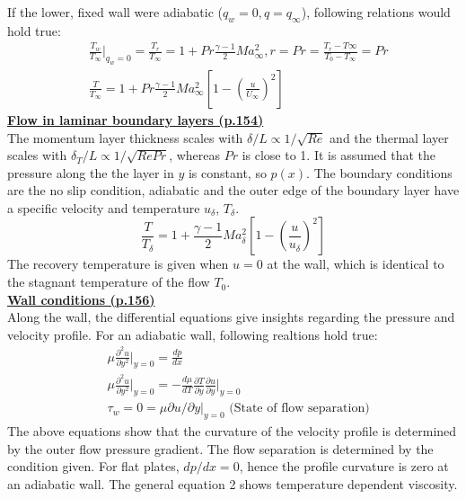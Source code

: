 \documentclass[8pt, landscape, fleqn]{scrartcl}
\begin{document}
\begin{multicols*}{3}
If the lower, fixed wall were adiabatic ($q_w = 0, q = q_\infty$), following relations would hold true:
\begin{align*}
    &\frac{T_w}{T_\infty}\vert_{q_w = 0} = \frac{T_r}{T_\infty} = 1 + Pr \frac{\gamma-1}{2}Ma_\infty^2, r = Pr = \frac{T_r-T\infty}{T_0-T_\infty} = Pr \\
    &\frac{T}{T_\infty} = 1 + Pr \frac{\gamma-1}{2}Ma_\infty^2\left[ 1- \left(  \frac{u}{U_\infty}\right)^2 \right]
\end{align*}
\underline{\textbf{Flow in laminar boundary layers (p.154)}} \\
The momentum layer thickness scales with $\delta / L \propto 1 / \sqrt{Re}$ and the thermal layer scales with $\delta_T / L\propto 1/\sqrt{Re Pr}$, whereas $Pr$ is close to 1. It is assumed that the pressure along the the layer in $y$ is constant, so $p(x)$. The boundary conditions are the no slip condition, adiabatic and the outer edge of the boundary layer have a specific velocity and temperature $u_{\delta}$, $T_\delta$.
\begin{equation*}
    \frac{T}{T_\delta} = 1 + \frac{\gamma-1}{2}Ma_\delta^2\left[ 1- \left( \frac{u}{u_\delta}\right)^2 \right]
\end{equation*} 
The recovery temperature is given when $u=0$ at the wall, which is identical to the stagnant temperature of the flow $T_0$. \\

\underline{\textbf{Wall conditions (p.156)}}\\
Along the wall, the differential equations give insights regarding the pressure and velocity profile. For an adiabatic wall, following realtions hold true:
\begin{align*}
    &\mu \frac{\partial^2 u}{\partial y^2}\vert_{y=0} = \frac{dp}{dx} \\
    & \mu \frac{\partial^2 u}{\partial y^2}\vert_{y=0} = - \frac{d \mu}{dT} \frac{\partial T}{\partial y} \frac{\partial u}{\partial y}\vert_{y=0} \\
    & \tau_w = 0 = \mu \partial u/\partial y |_{y=0} \text{  (State of flow separation)}
\end{align*}
The above equations show that the curvature of the velocity profile is determined by the outer flow pressure gradient. The flow separation is determined by the condition given. For flat plates, $dp/dx = 0$, hence the profile curvature is zero at an adiabatic wall. The general equation 2 shows temperature dependent viscosity. \\


\end{multicols*}
\end{document}
